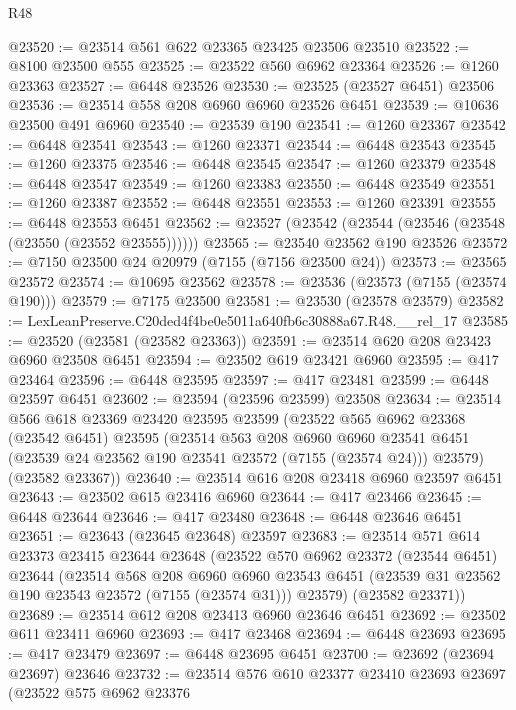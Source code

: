 \begin{lexlean}{R48}
\begin{coremodule}
@23520 := @23514 @561 @622 @23365 @23425 @23506 @23510
@23522 := @8100 @23500 @555
@23525 := @23522 @560 @6962 @23364
@23526 := @1260 @23363
@23527 := @6448 @23526
@23530 := @23525 (@23527 @6451) @23506
@23536 := @23514 @558 @208 @6960 @6960 @23526 @6451
@23539 := @10636 @23500 @491 @6960
@23540 := @23539 @190
@23541 := @1260 @23367
@23542 := @6448 @23541
@23543 := @1260 @23371
@23544 := @6448 @23543
@23545 := @1260 @23375
@23546 := @6448 @23545
@23547 := @1260 @23379
@23548 := @6448 @23547
@23549 := @1260 @23383
@23550 := @6448 @23549
@23551 := @1260 @23387
@23552 := @6448 @23551
@23553 := @1260 @23391
@23555 := @6448 @23553 @6451
@23562 := @23527 (@23542 (@23544 (@23546 (@23548 (@23550 (@23552 @23555))))))
@23565 := @23540 @23562 @190 @23526
@23572 := @7150 @23500 @24 @20979 (@7155 (@7156 @23500 @24))
@23573 := @23565 @23572
@23574 := @10695 @23562
@23578 := @23536 (@23573 (@7155 (@23574 @190)))
@23579 := @7175 @23500
@23581 := @23530 (@23578 @23579)
@23582 := LexLeanPreserve.C20ded4f4be0e5011a640fb6c30888a67.R48.__rel_17
@23585 := @23520 (@23581 (@23582 @23363))
@23591 := @23514 @620 @208 @23423 @6960 @23508 @6451
@23594 := @23502 @619 @23421 @6960
@23595 := @417 @23464
@23596 := @6448 @23595
@23597 := @417 @23481
@23599 := @6448 @23597 @6451
@23602 := @23594 (@23596 @23599) @23508
@23634 := @23514
    @566
    @618
    @23369
    @23420
    @23595
    @23599
    (@23522
      @565
      @6962
      @23368
      (@23542 @6451)
      @23595
      (@23514
        @563
        @208
        @6960
        @6960
        @23541
        @6451
        (@23539 @24 @23562 @190 @23541 @23572 (@7155 (@23574 @24)))
        @23579)
      (@23582 @23367))
@23640 := @23514 @616 @208 @23418 @6960 @23597 @6451
@23643 := @23502 @615 @23416 @6960
@23644 := @417 @23466
@23645 := @6448 @23644
@23646 := @417 @23480
@23648 := @6448 @23646 @6451
@23651 := @23643 (@23645 @23648) @23597
@23683 := @23514
    @571
    @614
    @23373
    @23415
    @23644
    @23648
    (@23522
      @570
      @6962
      @23372
      (@23544 @6451)
      @23644
      (@23514
        @568
        @208
        @6960
        @6960
        @23543
        @6451
        (@23539 @31 @23562 @190 @23543 @23572 (@7155 (@23574 @31)))
        @23579)
      (@23582 @23371))
@23689 := @23514 @612 @208 @23413 @6960 @23646 @6451
@23692 := @23502 @611 @23411 @6960
@23693 := @417 @23468
@23694 := @6448 @23693
@23695 := @417 @23479
@23697 := @6448 @23695 @6451
@23700 := @23692 (@23694 @23697) @23646
@23732 := @23514
    @576
    @610
    @23377
    @23410
    @23693
    @23697
    (@23522
      @575
      @6962
      @23376

\end{coremodule}
\end{lexlean}
